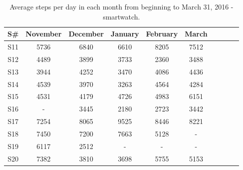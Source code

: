 \documentclass[12pt]{article} %
\begin{document}
\begin{table}[H]
\center
\begin{footnotesize}
	\begin{tabular}{| c | c | c | c | c | c | c | c | c | c |}
	\hline
	\textbf{S\#} & \textbf{November} & \textbf{December} & \textbf{January} & \textbf{February} & \textbf{March} \\
	
	\hline
	S11 & 5736 & 6840 & 6610 & 8205 & 7512\\
	\hline
	S12 & 4489 & 3899 & 3733 & 2360 & 3488\\
	\hline
	S13 & 3944 & 4252 & 3470 & 4086 & 4436\\
	\hline
	S14 & 4539 & 3970 & 3263 & 4564 & 4284\\
	\hline
	S15 & 4531 & 4179 & 4726 & 4983 & 6151\\
	\hline
	S16 & - & 3445 & 2180 & 2723 & 3442\\
	\hline
	S17 & 7254 & 8065 & 9525 & 8446 & 8221\\
	\hline
	S18 & 7450 & 7200 & 7663 & 5128 & - \\
	\hline
	S19 & 6117 & 2512 & - & - & -\\
	\hline
	S20 & 7382 & 3810 & 3698 & 5755 & 5153\\
	\hline
	\end{tabular}
	\caption{Average steps per day in each month from beginning to March 31, 2016 - smartwatch.}
	\label{tab:stepsrateWatch}
\end{footnotesize}
\end{table}
\end{document}
